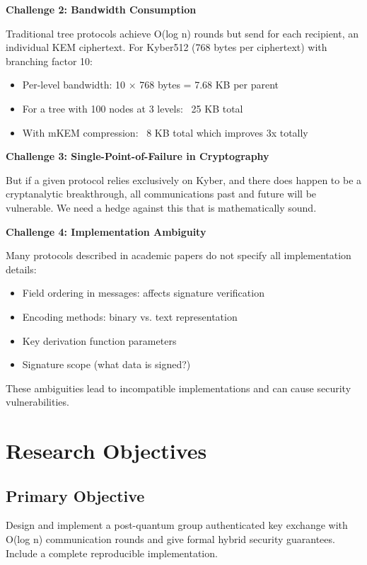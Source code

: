 \documentclass[12pt,a4paper]{report}
\begin{document}
\textbf{Challenge 2: Bandwidth Consumption}

Traditional tree protocols achieve O(log n) rounds but send for each recipient, an individual KEM ciphertext. For Kyber512 (768 bytes per ciphertext) with branching factor 10:
\begin{itemize}
\item Per-level bandwidth: 10 × 768 bytes = 7.68 KB per parent
\item For a tree with 100 nodes at 3 levels: ~25 KB total
\item With mKEM compression: ~8 KB total which improves 3x totally
\end{itemize}

\textbf{Challenge 3: Single-Point-of-Failure in Cryptography}

But if a given protocol relies exclusively on Kyber, and there does happen to be a cryptanalytic breakthrough, all communications past and future will be vulnerable. We need a hedge against this that is mathematically sound.

\textbf{Challenge 4: Implementation Ambiguity}

Many protocols described in academic papers do not specify all implementation details:
\begin{itemize}
\item Field ordering in messages: affects signature verification
\item Encoding methods: binary vs. text representation
\item Key derivation function parameters
\item Signature scope (what data is signed?)
\end{itemize}

These ambiguities lead to incompatible implementations and can cause security vulnerabilities.

\section{Research Objectives}

\subsection{Primary Objective}

Design and implement a post-quantum group authenticated key exchange with O(log n) communication rounds and give formal hybrid security guarantees. Include a complete reproducible implementation.
\end{document}
